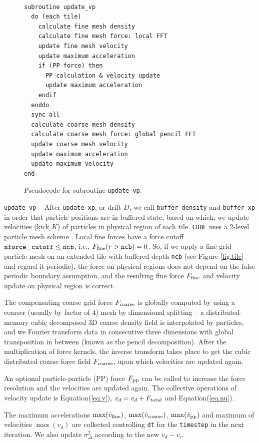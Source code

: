 \documentclass[10pt,twocolumn,preprint]{emulateapj}
\begin{document}
\begin{figure}[t]
\begin{verbatim}

subroutine update_vp
  do (each tile)
    calculate fine mesh density
    calculate fine mesh force: local FFT
    update fine mesh velocity
    update maximum acceleration
    if (PP force) then
      PP calculation & velocity update
      update maximum acceleration
    endif
  enddo
  sync all
  calculate coarse mesh density
  calculate coarse mesh force: global pencil FFT
  update coarse mesh velocity
  update maximum acceleration
  update maximum velocity
end
\end{verbatim}
\caption{Pseudocode for subroutine {\tt update\_vp}.}
\label{fig.update_vp}
\end{figure}

{\tt update\_vp} -- 
After {\tt update\_xp}, or drift $D$, we call {\tt buffer\_density} and {\tt buffer\_xp} in order that particle positions are in buffered state, based on which, we update velocities (kick $K$) of particles in physical region of each tile. {\tt CUBE} uses a 2-level particle mesh scheme \citep{2013MNRAS.436..540H}. Local fine forces have a force cutoff ${\tt nforce\_cutoff}\leq{\tt ncb}$, i.e., $F_{\rm fine}(r>{\tt ncb})=0$. So, if we apply a fine-grid particle-mesh on an extended tile with buffered-depth {\tt ncb} (see Figure \ref{fig.tile} and regard it periodic), the force on physical regions does not depend on the false periodic boundary assumption, and the resulting fine force $F_{\rm fine}$ and velocity update on physical region is correct.


The compensating coarse grid force $F_{\rm coarse}$ is globally computed by using a coarser (usually by factor of 4) mesh by dimensional splitting -- a distributed-memory cubic decomposed 3D coarse density field is interpolated by particles, and we Fourier transform data in consecutive three dimensions with global transposition in between (known as the pencil decomposition). After the multiplication of force kernels, the inverse transform takes place to get the cubic distributed coarse force field $F_{\rm coarse}$, upon which velocities are updated again.

An optional particle-particle (PP) force $F_{\rm pp}$ can be called to increase the force resolution and the velocities are updated again. The collective operations of velocity update is Equation(\ref{eq.v}), $v_d=v_d+F_{\rm total}$ and Equation(\ref{eq.nu}).

The maximum accelerations $\max(\dot{v}_{\rm fine})$, $\max(\dot{v}_{\rm coarse})$, $\max(\dot{v}_{\rm pp})$ and maximum of velocities $\max(v_d)$ are collected controlling {\tt dt} for the {\tt timestep} in the next iteration. We also update $\sigma^2_{\Delta}$ according to the new $v_d-v_c$.
\end{document}
